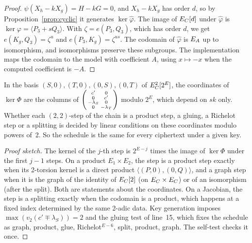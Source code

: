 \begin{proof}
$\psi(X_h-kX_g)=H-kG=0$, and $X_h-kX_g$ has order $d$, so by
Proposition~\ref{prop:cyclic} it generates $\ker\hat\varphi$. The image of
$E_C[d]$ under $\hat\varphi$ is $\ker\varphi=\langle P_3+sQ_3\rangle$. With
$\zeta=e(P_3,Q_3)$, which has order $d$, we get $e(K_g,Q_3)=\zeta^u$ and
$e(P_3,K_g)=\zeta^{us}$. The codomain of $\hat\varphi$ is $E_A$ up to
isomorphism, and isomorphisms preserve these subgroups. The implementation
maps the codomain to the model with coefficient $A$, using $x\mapsto-x$ when
the computed coefficient is $-A$.
\end{proof}

\begin{proposition}\label{prop:schedule}
In the basis $(S,0),(T,0),(0,S),(0,T)$ of $E_C^2[2^E]$, the coordinates of
$\ker\Phi$ are the columns of
$\begin{psmallmatrix}c'&0\\0&c'\\-\lambda_S&0\\0&-\lambda_T\end{psmallmatrix}$
modulo $2^E$, which depend on $\mathit{sk}$ only. Whether each $(2,2)$-step of
the chain is a product step, a gluing, a Richelot step or a splitting is
decided by linear conditions on these coordinates modulo powers of~2. So the
schedule is the same for every ciphertext under a given key.
\end{proposition}

\begin{proof}[Proof sketch]
The kernel of the $j$-th step is $2^{E-j}$ times the image of $\ker\Phi$ under
the first $j-1$ steps. On a product $E_1\times E_2$, the step is a product
step exactly when its 2-torsion kernel is a direct product
$\langle(P,0),(0,Q)\rangle$, and a graph step when it is the graph of the
identity of $E_C[2]$ (on $E_C\times E_C$) or of an isomorphism (after the
split). Both are statements about the coordinates. On a Jacobian, the step
is a splitting exactly when the codomain is a product, which happens at a
fixed index determined by the same 2-adic data. Key generation imposes
$\max(v_2(c'\mp\lambda_S))=2$ and the gluing test of line~15, which fixes the
schedule as graph, product, glue, Richelot${}^{E-6}$, split, product, graph.
The self-test checks it once.
\end{proof}

